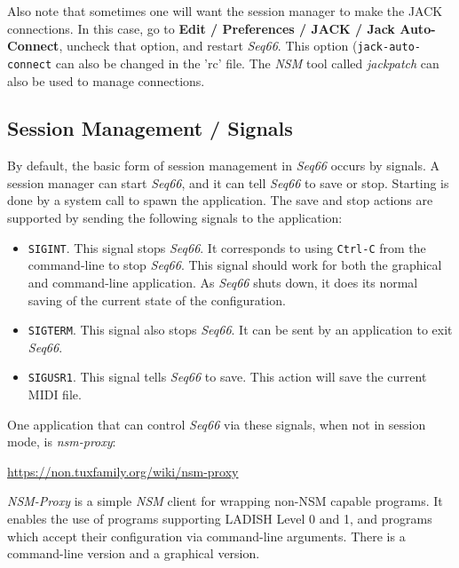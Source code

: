    Also note that sometimes one will want the session manager to make the JACK
   connections.  In this case, go to
   \textbf{Edit / Preferences / JACK / Jack Auto-Connect}, uncheck that option,
   and restart \textsl{Seq66}.  This option (\texttt{jack-auto-connect}
   can also be changed in the 'rc' file.
   The \textsl{NSM} tool called \textsl{jackpatch} can also be used to manage
   connections.

\subsection{Session Management / Signals}
\label{subsec:sessions_signals}

   By default, the basic form of session management in
   \textsl{Seq66} occurs by signals.  A
   session manager can start \textsl{Seq66}, and it can tell \textsl{Seq66} to
   save or stop.  Starting is done by a system call to spawn the application.
   The save and stop actions are supported by sending the following signals to
   the application:

   \begin{itemize}
      \item \texttt{SIGINT}.
         This signal stops \textsl{Seq66}. It corresponds
         to using \texttt{Ctrl-C} from the command-line to stop \textsl{Seq66}.
         This signal should work for both the graphical and command-line
         application.  As \textsl{Seq66} shuts down, it does its normal saving
         of the current state of the configuration.
      \item \texttt{SIGTERM}.
         This signal also stops \textsl{Seq66}.  It can
         be sent by an application to exit \textsl{Seq66}.
      \item \texttt{SIGUSR1}.
         This signal tells \textsl{Seq66} to save.  This
         action will save the current MIDI file.
   \end{itemize}

   One application that can control \textsl{Seq66} via these signals, when not
   in session mode, is \textsl{nsm-proxy}:

      \url{https://non.tuxfamily.org/wiki/nsm-proxy}

   \textsl{NSM-Proxy} is a simple \textsl{NSM} client for wrapping non-NSM
   capable programs. It enables the use of programs supporting LADISH Level 0
   and 1, and programs which accept their configuration via command-line
   arguments.  There is a command-line version and a graphical version.

